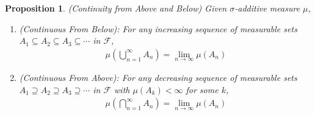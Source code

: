 \documentclass[12pt]{article}
\theoremstyle{plain}
\newtheorem{prop}[thm]{Proposition}
\theoremstyle{definition}
\theoremstyle{remark}
\newcommand{\sF}{\mathscr{F}}
\begin{document}
\begin{prop}\emph{(Continuity from Above and Below)}
\label{prop:prop-meas}
Given $\sigma$-additive measure $\mu$,
\begin{enumerate}
  \item \emph{(Continuous From Below)}: For any increasing sequence of
    measurable sets $A_1\subseteq A_2\subseteq A_3 \subseteq \cdots$ in
    $\sF$,
    \begin{align*}
      \mu\left(\bigcup^\infty_{n=1} A_n\right) =
      \lim_{n\rightarrow\infty} \mu(A_n)
    \end{align*}

  \item \emph{(Continuous From Above)}:
    For any decreasing sequence of measurable sets
    $A_1 \supseteq A_2 \supseteq A_3 \supseteq \cdots$ in $\sF$
    with $\mu(A_k)<\infty$ for some $k$,
    \begin{align*}
      \mu\left(\bigcap^\infty_{n=1} A_n\right)
      = \lim_{n\rightarrow\infty} \mu(A_n)
    \end{align*}
\end{enumerate}
\end{prop}
\end{document}
